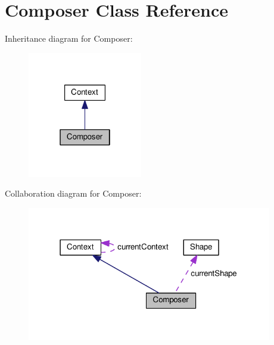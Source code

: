 \hypertarget{classComposer}{}\section{Composer Class Reference}
\label{classComposer}


Inheritance diagram for Composer\+:
\nopagebreak
\begin{figure}[H]
\begin{center}
\leavevmode
\includegraphics[width=142pt]{classComposer__inherit__graph}
\end{center}
\end{figure}


Collaboration diagram for Composer\+:
\nopagebreak
\begin{figure}[H]
\begin{center}
\leavevmode
\includegraphics[width=303pt]{classComposer__coll__graph}
\end{center}
\end{figure}
